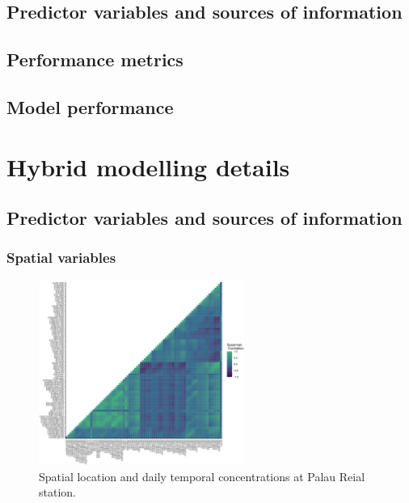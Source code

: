 \documentclass{article}
\begin{document}
\subsection{Predictor variables and sources of information}

\subsection{Performance metrics}

\subsection{Model performance}


\newpage

\section{Hybrid modelling details}

\subsection{Predictor variables and sources of information}

\subsubsection{Spatial variables}

\captionsetup[figure]{skip=6pt} %
\begin{figure}[!htb]
    \centering
    \includegraphics[width=0.6\textwidth]{figures/lur_pred_corr.png} %
    \caption{Spatial location and daily temporal concentrations at Palau Reial station.}
    \label{FigureS1} %
\end{figure}
\end{document}
